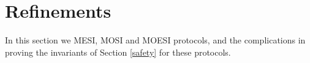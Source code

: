 \section{Refinements}
\label{sec:Refinements}

In this section we MESI, MOSI and MOESI protocols, and the
complications in proving the invariants of Section \ref{safety} for these protocols.
%
%
%
%
%
%

